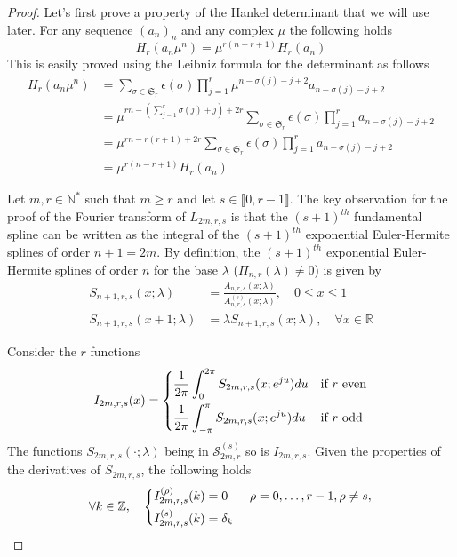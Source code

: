 \documentclass[a4paper, 11pt]{article}
\begin{document}
\begin{proof}
  Let's first prove a property of the Hankel determinant that we will use later. For any sequence ${(a_n)}_n$ and any 
  complex $\mu$ the following holds
  \begin{equation}\label{prop:hankel}
    H_r(a_n \mu^n) = \mu^{r(n-r+1)} H_r(a_n)
  \end{equation}
  This is easily proved using the Leibniz formula for the determinant as follows
  \begin{align*}
    H_r(a_n \mu^n) &= \sum_{\sigma \in \mathfrak{S}_r} \epsilon(\sigma) \prod_{j=1}^r \mu^{n-\sigma(j) - j+2} 
    a_{n-\sigma(j)-j+2} \\
    &= \mu^{rn-(\sum_{j=1}^r \sigma(j) + j) + 2r} \sum_{\sigma \in \mathfrak{S}_r} \epsilon(\sigma) \prod_{j=1}^r  
    a_{n-\sigma(j)-j+2} \\
    &= \mu^{rn-r(r+1) + 2r} \sum_{\sigma \in \mathfrak{S}_r} \epsilon(\sigma) \prod_{j=1}^r  a_{n-\sigma(j)-j+2} \\
    &= \mu^{r(n-r+1)} H_r(a_n)
  \end{align*}
  
  Let $m, r \in \mathbb{N}^*$ such that $m \geq r$ and let $s \in \llbracket0, r-1\rrbracket$. The key observation for 
  the proof of the Fourier transform of $L_{2m,r,s}$ is that the $(s+1)^{th}$ fundamental spline can be written as the 
  integral of the $(s+1)^{th}$ exponential Euler-Hermite splines of order $n+1=2m$.  By definition, the $(s+1)^{th}$ 
  exponential Euler-Hermite splines of order $n$ for the base $\lambda$ ($\Pi_{n,r}(\lambda) \neq 0$) is given by
  \begin{align}
    S_{n+1,r,s}(x;\lambda) &= \frac{A_{n,r,s}(x; \lambda)}{A_{n,r,s}^{(s)}(x; \lambda)}, \quad 0 \leq x \leq 1 \\
    S_{n+1,r,s}(x+1;\lambda) &= \lambda S_{n+1,r,s}(x;\lambda), \quad \forall x \in \mathbb{R}
  \end{align}
   
  Consider the $r$ functions
  \begin{equation}\label{eq:def-I}
    I_{2m,r,s}(x) = \begin{dcases}
      \frac{1}{2\pi} \int_0^{2\pi} S_{2m, r, s}(x;e^{ju}) du & \text{if $r$ even} \\
      \frac{1}{2\pi} \int_{-\pi}^{\pi} S_{2m, r, s}(x;e^{ju}) du & \text{if $r$ odd} \\
    \end{dcases}
  \end{equation}
  The functions $S_{2m,r,s}(\cdot;\lambda)$ being in $\mathscr{S}_{2m,r}^{(s)}$ so is $I_{2m,r,s}$. Given the properties 
  of the derivatives of $S_{2m,r,s}$, the following holds 
  \begin{equation*}
    \forall k \in \mathbb{Z}, \quad 
    \begin{dcases}
      I_{2m,r,s}^{(\rho)}(k) = 0 & \ \rho=0, \ldots, r-1, \rho \neq s,  \\
      I_{2m,r,s}^{(s)}(k) = \delta_k &
    \end{dcases}
  \end{equation*}
  

\end{proof}
\end{document}
